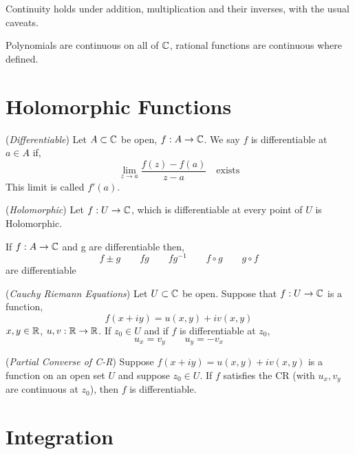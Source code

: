 \documentclass{article}
\begin{document}
\begin{nthm}
  Continuity holds under addition, multiplication and their inverses, with the usual caveats.
\end{nthm}

\begin{remark}
  Polynomials are continuous on all of $\mathbb{C}$, rational functions are continuous where defined.
\end{remark}

\section{Holomorphic Functions}

\begin{ndefi}{(\textit{Differentiable})}
  Let $A \subset \mathbb{C}$ be open, $f : A \to \mathbb{C}$. We say $f$ is differentiable at $a\in A$ if,
  $$ \lim_{z \to a} {\frac{f(z) - f(a)}{z - a}} \quad\text{exists} $$
  This limit is called $f'(a)$.
\end{ndefi}

\begin{ndefi}{(\textit{Holomorphic})}
  Let $f: U \to \mathbb{C}$, which is differentiable at every point of $U$ is Holomorphic.
\end{ndefi}

\begin{nthm}
  If $f : A \to \mathbb{C}$ and g are differentiable then,
  $$ f \pm g \qquad fg \qquad fg^{-1} \qquad f \circ g \qquad g \circ f $$
  are differentiable
\end{nthm}

\begin{nthm}{(\textit{Cauchy Riemann Equations})}
  Let $U \subset \mathbb{C}$ be open. Suppose that $f : U \to \mathbb{C}$ is a function,
  $$ f(x + iy) = u(x, y) + iv(x, y) $$
  $x, y \in \mathbb{R}$, $u, v : \mathbb{R} \to \mathbb{R}$. If $z_0 \in U$ and if $f$ is differentiable at $z_0$,
  $$ u_x = v_y \qquad u_y = -v_x $$
\end{nthm}

\begin{nlemma}{(\textit{Partial Converse of C-R})}
  Suppose $f(x + iy) = u(x, y) + iv(x, y)$ is a function on an open set $U$ and suppose $z_0 \in U$. If $f$ satisfies the CR (with $u_x, v_y$ are continuous at $z_0$), then $f$ is differentiable.
\end{nlemma}

\section{Integration}
\end{document}
